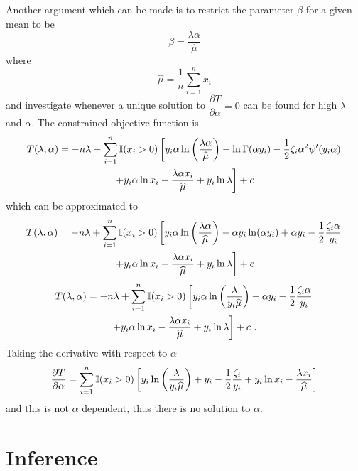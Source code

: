 \documentclass[12pt, a4paper]{memoir}
\begin{document}
Another argument which can be made is to restrict the parameter $\beta$ for a given mean to be
\begin{equation}
\beta = \frac{\lambda\alpha}{\widehat{\mu}}
\label{eq:compoundPoisson:beta_restrict}
\end{equation}
where
\begin{equation}
\widehat{\mu} = \frac{1}{n}\sum_{i=1}^n x_i
\end{equation}
and investigate whenever a unique solution to $\dfrac{\partial T}{\partial \alpha} = 0$ can be found for high $\lambda$ and $\alpha$. The constrained objective function is
\begin{multline*}
T(\lambda,\alpha)
=
-n\lambda+
	\sum_{i=1}^n
	\mathbb{I}(x_i>0)
	\left[
	y_i\alpha\ln\left(\frac{\lambda\alpha}{\widehat{\mu}}\right)-\ln\Gamma(\alpha y_i) - \frac{1}{2}\zeta_i\alpha^2\psi'(y_i\alpha)
	\right.\\\left.
	+y_i\alpha\ln x_i - \frac{\lambda\alpha x_i}{\widehat{\mu}}
	+ y_i \ln \lambda
	\vphantom{\frac{1}{1}}\right] + c
\end{multline*}
which can be approximated to
\begin{multline*}
T(\lambda,\alpha)
=
-n\lambda+
	\sum_{i=1}^n
	\mathbb{I}(x_i>0)
	\left[
	y_i\alpha\ln\left(\frac{\lambda\alpha}{\widehat{\mu}}\right)-\alpha y_i\ln(\alpha y_i) + \alpha y_i - \frac{1}{2}\frac{\zeta_i\alpha}{y_i}
	\right.\\\left.
	+y_i\alpha\ln x_i - \frac{\lambda\alpha x_i}{\widehat{\mu}}
	+ y_i \ln \lambda
	\vphantom{\frac{1}{1}}\right] + c
\end{multline*}
\begin{multline*}
T(\lambda,\alpha)
=
-n\lambda+
	\sum_{i=1}^n
	\mathbb{I}(x_i>0)
	\left[
	y_i\alpha\ln\left(\frac{\lambda}{y_i\widehat{\mu}}\right) + \alpha y_i - \frac{1}{2}\frac{\zeta_i\alpha}{y_i}
	\right.\\\left.
	+y_i\alpha\ln x_i - \frac{\lambda\alpha x_i}{\widehat{\mu}}
	+ y_i \ln \lambda
	\vphantom{\frac{1}{1}}\right] + c \ .
\end{multline*}
Taking the derivative with respect to $\alpha$
\begin{equation*}
\frac{\partial T}{\partial \alpha}
=
	\sum_{i=1}^n
	\mathbb{I}(x_i>0)
	\left[
	y_i\ln\left(\frac{\lambda}{y_i\widehat{\mu}}\right) +  y_i - \frac{1}{2}\frac{\zeta_i}{y_i}
	+y_i\ln x_i - \frac{\lambda x_i}{\widehat{\mu}}
	\vphantom{\frac{1}{1}}\right]
\end{equation*}
and this is not $\alpha$ dependent, thus there is no solution to $\alpha$.

\chapter{Inference}



\end{document}
